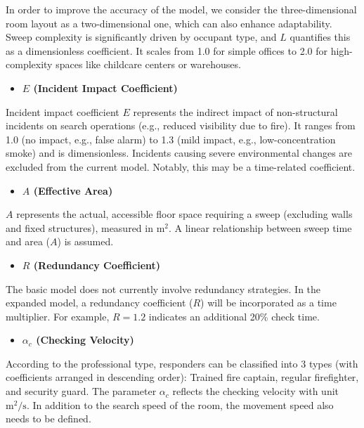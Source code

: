     In order to improve the accuracy of the model, we consider the three-dimensional room layout as a two-dimensional one, which can also enhance adaptability. Sweep complexity is significantly driven by occupant type, and $L$ quantifies this as a dimensionless coefficient. It scales from 1.0 for simple offices to 2.0 for high-complexity spaces like childcare centers or warehouses.


    \begin{itemize}
    \item \textbf{$E$ (Incident Impact Coefficient)} 
    \end{itemize}
    
    Incident impact coefficient $E$ represents the indirect impact of non-structural incidents on search operations (e.g., reduced visibility due to fire). It ranges from 1.0 (no impact, e.g., false alarm) to 1.3 (mild impact, e.g., low-concentration smoke) and is dimensionless. Incidents causing severe environmental changes are excluded from the current model. Notably, this may be a time-related coefficient.
    
    \begin{itemize}
    \item \textbf{$A$ (Effective Area)} 
    \end{itemize}
    
    $A$ represents the actual, accessible floor space requiring a sweep (excluding walls and fixed structures), measured in $\text{m}^2$. A linear relationship between sweep time and area ($A$) is assumed.
  
    \begin{itemize}
    \item \textbf{$R$ (Redundancy Coefficient)} 
    \end{itemize}
    
    The basic model does not currently involve redundancy strategies. In the expanded model, a redundancy coefficient ($R$) will be incorporated as a time multiplier. For example, $R=1.2$ indicates an additional 20\% check time.



    \begin{itemize}
    \item \textbf{$\alpha_c$ (Checking Velocity)} 
    \end{itemize}

    According to the professional type, responders can be classified into 3 types (with coefficients arranged in descending order): Trained fire captain, regular firefighter, and security guard. The parameter $\alpha_c$ reflects the checking velocity with unit $\text{m}^2/\text{s}$. In addition to the search speed of the room, the movement speed also needs to be defined. 
    
